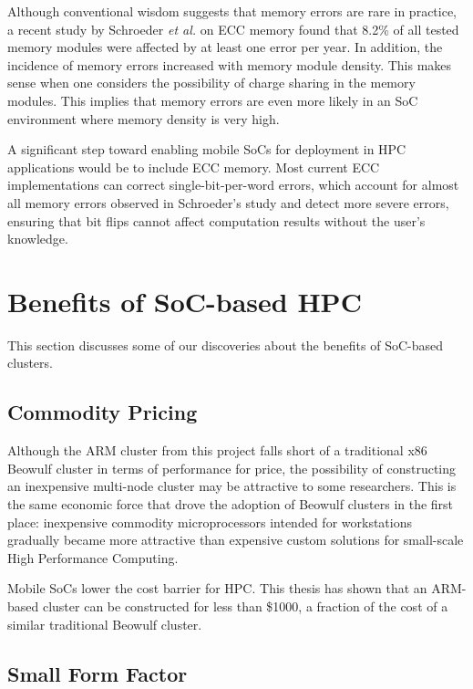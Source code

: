 \documentclass[11pt]{book}
\begin{document}
Although conventional wisdom suggests that memory errors are rare in practice, a recent
study by Schroeder \emph{et al.} \cite{schroeder-09} on ECC memory found that 8.2\% of all
tested memory modules were affected by at least one error per year.  In addition, the
incidence of memory errors increased with memory module density.  This makes sense when
one considers the possibility of charge sharing in the memory modules.  This implies that
memory errors are even more likely in an SoC environment where memory density is very
high.

A significant step toward enabling mobile SoCs for deployment in HPC applications would be
to include ECC memory.  Most current ECC implementations can correct single-bit-per-word
errors, which account for almost all memory errors observed in Schroeder's study
\cite{schroeder-09} and detect more severe errors, ensuring that bit flips cannot affect
computation results without the user's knowledge.

\section{Benefits of SoC-based HPC}

This section discusses some of our discoveries about the benefits of SoC-based clusters.

\subsection{Commodity Pricing}

Although the ARM cluster from this project falls short of a traditional x86 Beowulf
cluster in terms of performance for price, the possibility of constructing an inexpensive
multi-node cluster may be attractive to some researchers.  This is the same economic force
that drove the adoption of Beowulf clusters in the first place: inexpensive commodity
microprocessors intended for workstations gradually became more attractive than expensive
custom solutions for small-scale High Performance Computing.

Mobile SoCs lower the cost barrier for HPC. This thesis has shown that an ARM-based cluster can be constructed for less than \$1000, a fraction of the cost of a similar traditional Beowulf cluster.

\subsection{Small Form Factor}
\end{document}
